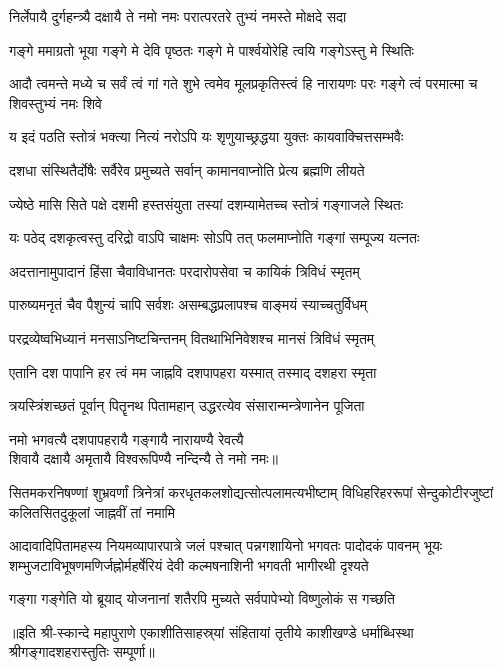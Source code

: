 \twolineshloka
{निर्लेपायै दुर्गहन्त्र्यै दक्षायै ते नमो नमः}
{परात्परतरे तुभ्यं नमस्ते मोक्षदे सदा}%

\twolineshloka
{गङ्गे ममाग्रतो भूया गङ्गे मे देवि पृष्ठतः}
{गङ्गे मे पार्श्वयोरेहि त्वयि गङ्गेऽस्तु मे स्थितिः}%

\threelineshloka
{आदौ त्वमन्ते मध्ये च सर्वं त्वं गां गते शुभे}
{त्वमेव मूलप्रकृतिस्त्वं हि नारायणः परः}%
{गङ्गे त्वं परमात्मा च शिवस्तुभ्यं नमः शिवे}

\twolineshloka
{य इदं पठति स्तोत्रं भक्त्या नित्यं नरोऽपि यः}%
{शृणुयाच्छ्रद्धया युक्तः कायवाक्चित्तसम्भवैः}

\twolineshloka
{दशधा  संस्थितैर्दोषैः सर्वैरेव प्रमुच्यते}%
{सर्वान् कामानवाप्नोति प्रेत्य ब्रह्मणि लीयते}

\twolineshloka
{ज्येष्ठे मासि सिते पक्षे दशमी हस्तसंयुता}%
{तस्यां दशम्यामेतच्च स्तोत्रं गङ्गाजले स्थितः}

\twolineshloka
{यः पठेद् दशकृत्वस्तु दरिद्रो वाऽपि चाक्षमः}%
{सोऽपि तत् फलमाप्नोति गङ्गां सम्पूज्य यत्नतः}

\twolineshloka
{अदत्तानामुपादानं हिंसा चैवाविधानतः}%
{परदारोपसेवा च कायिकं त्रिविधं स्मृतम्}

\twolineshloka
{पारुष्यमनृतं चैव पैशुन्यं चापि सर्वशः}%
{असम्बद्धप्रलापश्च वाङ्मयं स्याच्चतुर्विधम्}

\twolineshloka
{परद्रव्येष्वभिध्यानं मनसाऽनिष्टचिन्तनम्}%
{वितथाभिनिवेशश्च मानसं त्रिविधं स्मृतम्}

\twolineshloka
{एतानि दश पापानि हर त्वं मम जाह्नवि}%
{दशपापहरा यस्मात् तस्माद् दशहरा स्मृता}

\twolineshloka
{त्रयस्त्रिंशच्छतं पूर्वान् पितॄनथ पितामहान्}%
{उद्धरत्येव संसारान्मन्त्रेणानेन पूजिता}%


{नमो भगवत्यै दशपापहरायै गङ्गायै नारायण्यै रेवत्यै}\\
{शिवायै दक्षायै अमृतायै विश्वरूपिण्यै नन्दिन्यै ते नमो नमः॥}%

\fourlineindentedshloka
{सितमकरनिषण्णां शुभ्रवर्णां त्रिनेत्रां}
{करधृतकलशोद्यत्सोत्पलामत्यभीष्टाम्}%
{विधिहरिहररूपां सेन्दुकोटीरजुष्टां}
{कलितसितदुकूलां जाह्नवीं तां नमामि}%

\fourlineindentedshloka
{आदावादिपितामहस्य नियमव्यापारपात्रे जलं}
        {पश्चात् पन्नगशायिनो भगवतः पादोदकं पावनम्}
{भूयः शम्भुजटाविभूषणमणिर्जह्नोर्महर्षेरियं}
        {देवी कल्मषनाशिनी भगवती भागीरथी दृश्यते}  %

\twolineshloka
{गङ्गा गङ्गेति यो ब्रूयाद् योजनानां शतैरपि}
{मुच्यते सर्वपापेभ्यो विष्णुलोकं स गच्छति}%

॥इति श्री-स्कान्दे महापुराणे एकाशीतिसाहस्र्यां संहितायां तृतीये काशीखण्डे धर्माब्धिस्था श्रीगङ्गादशहरास्तुतिः सम्पूर्णा॥
